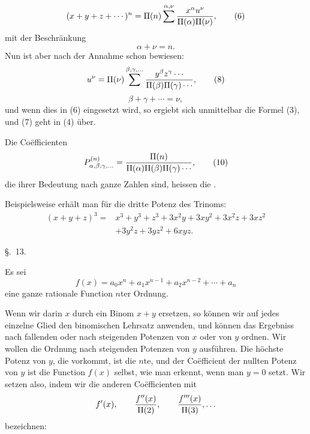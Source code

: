 
\begin{equation}
 (x+y+z+\cdots)^n=\Pi(n)\sum^{\alpha,\nu}{x^\alpha u^\nu
\over \Pi(\alpha)\Pi(\nu)},
\tag{6}
\end{equation}
mit der Beschränkung
\begin{equation}
 \alpha+\nu=n.
\tag{7}
\end{equation}
Nun ist aber nach der Annahme schon bewiesen:
\begin{equation}
 u^\nu=\Pi(\nu)\sum^{\beta,\gamma,\ldots}
 {y^\beta z^\gamma\cdots
\over \Pi(\beta)\Pi(\gamma)\cdots},
\tag{8}
\end{equation}
\begin{equation}
 \beta+\gamma+\cdots=\nu,
\tag{9}
\end{equation}
und wenn dies in (6) eingesetzt wird, so ergiebt sich unmittelbar die Formel (3), und (7) geht in (4) über.

Die Coëfficienten
\begin{equation}
 P_{\alpha,\beta,\gamma,\ldots}^{(n)}={\Pi(n)\over
 \Pi(\alpha)\Pi(\beta)\Pi(\gamma)\cdots},
\tag{10}
\end{equation}
die ihrer Bedeutung nach ganze Zahlen sind, heissen die .

Beispielsweise erhält man für die dritte Potenz des Trinoms:
\begin{equation}
\begin{aligned}
(x+y+z)^3={}&x^3+y^3+z^3+3x^2y+3xy^2+3x^2z+3xz^2\\
&+3y^2z+3yz^2+6xyz.
\end{aligned}
\tag{11}
\end{equation}

\begin{center}
{\large \S.\ 13.}

\vspace{0.5em}
{\large{}}
\end{center}

Es sei
\begin{equation}
 f(x)=a_0x^n+a_1x^{n-1}+a_2x^{n-2}+\cdots+a_n
\tag{1}
\end{equation}
eine ganze rationale Function $n$ter Ordnung.

Wenn wir darin $x$ durch ein Binom $x+y$ ersetzen, so können wir auf jedes einzelne Glied den binomischen Lehrsatz anwenden, und können das Ergebniss nach fallenden oder nach steigenden Potenzen von $x$ oder von $y$ ordnen. Wir wollen die Ordnung nach steigenden Potenzen von $y$ ausführen. Die höchste Potenz von $y$, die vorkommt, ist die $n$te, und der Coëfficient der nullten Potenz von $y$ ist die Function $f(x)$ selbst, wie man erkennt, wenn man $y=0$ setzt. Wir setzen also, indem wir die anderen Coëfficienten mit
\[
 f'(x),\qquad {f''(x)\over \Pi(2)},\qquad {f'''(x)\over \Pi(3)},\ldots
\]
bezeichnen:
